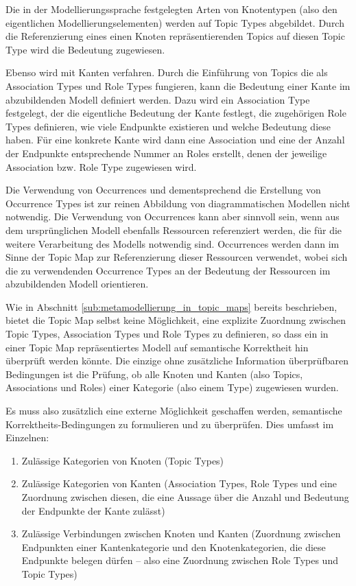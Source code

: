 Die in der Modellierungssprache festgelegten Arten von Knotentypen (also den eigentlichen Modellierungselementen) werden auf Topic Types abgebildet. Durch die Referenzierung eines einen Knoten repräsentierenden Topics auf diesen Topic Type wird die Bedeutung zugewiesen.

Ebenso wird mit Kanten verfahren. Durch die Einführung von Topics die als Association Types und Role Types fungieren, kann die Bedeutung einer Kante im abzubildenden Modell definiert werden. Dazu wird ein Association Type festgelegt, der die eigentliche Bedeutung der Kante festlegt, die zugehörigen Role Types definieren, wie viele Endpunkte existieren und welche Bedeutung diese haben. Für eine konkrete Kante wird dann eine Association und eine der Anzahl der Endpunkte entsprechende Nummer an Roles erstellt, denen der jeweilige Association bzw. Role Type zugewiesen wird. 

Die Verwendung von Occurrences und dementsprechend die Erstellung von Occurrence Types ist zur reinen Abbildung von diagrammatischen Modellen nicht notwendig. Die Verwendung von Occurrences kann aber sinnvoll sein, wenn aus dem ursprünglichen Modell ebenfalls Ressourcen referenziert werden, die für die weitere Verarbeitung des Modells notwendig sind. Occurrences werden dann im Sinne der Topic Map zur Referenzierung dieser Ressourcen verwendet, wobei sich die zu verwendenden Occurrence Types an der Bedeutung der Ressourcen im abzubildenden Modell orientieren.

Wie in Abschnitt \ref{sub:metamodellierung_in_topic_maps} bereits beschrieben, bietet die Topic Map selbst keine Möglichkeit, eine explizite Zuordnung zwischen Topic Types, Association Types und Role Types zu definieren, so dass ein in einer Topic Map repräsentiertes Modell auf semantische Korrektheit hin überprüft werden könnte. Die einzige ohne zusätzliche Information überprüfbaren Bedingungen ist die Prüfung, ob alle Knoten und Kanten (also Topics, Associations und Roles) einer Kategorie (also einem Type) zugewiesen  wurden.

Es muss also zusätzlich eine externe Möglichkeit geschaffen werden, semantische Korrektheits-Bedingungen zu formulieren und zu überprüfen. Dies umfasst im Einzelnen:
\begin{enumerate}
 \item Zulässige Kategorien von Knoten (Topic Types)
 \item Zulässige Kategorien von Kanten (Association Types, Role Types und eine Zuordnung zwischen diesen, die eine Aussage über die Anzahl und Bedeutung der Endpunkte der Kante zulässt)
 \item Zulässige Verbindungen zwischen Knoten und Kanten (Zuordnung zwischen Endpunkten einer Kantenkategorie und den Knotenkategorien, die diese Endpunkte belegen dürfen -- also eine Zuordnung zwischen Role Types und Topic Types)
\end{enumerate}

